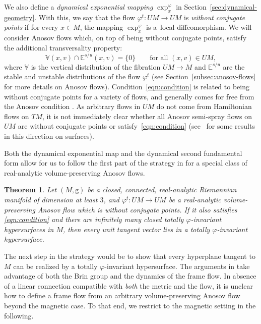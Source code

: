 \documentclass[pdftex]{sigma}
\newcommand{\g}{\mathrm{g}}
\newcommand{\E}{\mathbb{E}}
\numberwithin{equation}{section}
\newtheorem{theoremA}{Theorem}
\theoremstyle{definition}
\begin{document}
We also define a \emph{dynamical exponential mapping} $\exp_x^\varphi$ in Section~\ref{sec:dynamical-geometry}. With this, we say that the flow $\varphi^t \colon UM \rightarrow UM$ is \emph{without conjugate points} if for every $x \in M$, the mapping $\exp_x^{\varphi}$ is a~local diffeomorphism.
We will consider Anosov flows which, on top of being without conjugate points, satisfy the additional transversality property:
\begin{equation} \label{eqn:condition}
 \mathbb{V}(x,v) \cap \E^{s/u}(x,v) = \{0\} \qquad\text{for all }(x,v) \in UM,
\end{equation}
where $\mathbb{V}$ is the vertical distribution of the fibration $UM\to M$ and $\mathbb{E}^{s/u}$ are the stable and unstable distributions of the flow $\varphi^t$ (see Section~\ref{subsec:anosov-flows} for more details on Anosov flows). Condition~\eqref{eqn:condition} is related to being without conjugate points for a variety of flows, and generally comes for free from the Anosov condition \cite{contreras2003asymptotic, Paternains-94-convex}. As arbitrary flows in $UM$ do not come from Hamiltonian flows on $TM$, it is not immediately clear whether all Anosov semi-spray flows on~$UM$ are without conjugate points or satisfy~\eqref{eqn:condition} (see~\cite{cuesta2025creation} for some results in this direction on surfaces).

Both the dynamical exponential map and the dynamical second fundamental form allow for us to follow the first part of the strategy in \cite[Section~3.1]{filip2024finiteness} for a special class of real-analytic volume-preserving Anosov flows.

\begin{theoremA} \label{thm:vol-preserving}
 Let $(M,\g)$ be a closed, connected, real-analytic Riemannian manifold of dimension at least $3$, and $\varphi^t\colon UM\to UM$ be a real-analytic volume-preserving Anosov flow which is without conjugate points. If it also satisfies \eqref{eqn:condition} and there are infinitely many closed totally $\varphi$-invariant hypersurfaces in $M$, then every unit tangent vector lies in a totally $\varphi$-invariant hypersurface.
\end{theoremA}

The next step in the strategy would be to show that every hyperplane tangent to $M$ can be realized by a totally $\varphi$-invariant hypersurface. The arguments in \cite{filip2024finiteness} take advantage of both the Brin group and the dynamics of the frame flow. In absence of a linear connection compatible with \emph{both} the metric and the flow, it is unclear how to define a frame flow from an arbitrary volume-preserving Anosov flow beyond the magnetic case. To that end, we restrict to the magnetic setting in the following.
\end{document}
